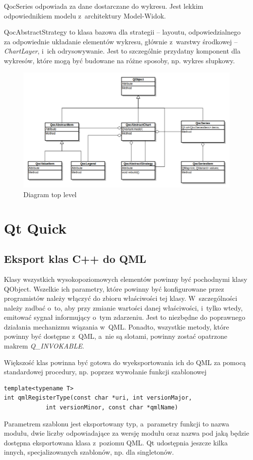 QocSeries odpowiada za dane dostarczane do wykresu. Jest lekkim odpowiednikiem modelu z~architektury Model-Widok.

QocAbstractStrategy to klasa bazowa dla strategii -- layoutu, odpowiedzialnego za odpowiednie układanie elementów wykresu, głównie z~warstwy środkowej -- \textit{ChartLayer}, i~ich odrysowywanie. Jest to szczególnie przydatny komponent dla wykresów, które mogą być budowane na różne sposoby, np. wykres słupkowy.


\begin{figure}
\centering
\caption{Diagram top level}\label{rys:klasy:top_level}
\includegraphics[scale=0.5]{img/klasy-top_level.png}
\end{figure}


\section{Qt Quick}

\subsection{Eksport klas C++ do QML}
Klasy wszystkich wysokopoziomowych elementów powinny być pochodnymi klasy QObject. Wszelkie ich parametry, które powinny być konfigurowane przez programistów należy włączyć do zbioru właściwości tej klasy. W~szczególności należy zadbać o~to, aby przy zmianie wartości danej właściwości, i~tylko wtedy, emitować sygnał informujący o~tym zdarzeniu. Jest to niezbędne do poprawnego działania mechanizmu wiązania w~QML. Ponadto, wszystkie metody, które powinny być dostępne z~QML, a~nie są slotami, powinny zostać opatrzone makrem \textit{Q\_INVOKABLE}.

Większość klas powinna być gotowa do wyeksportowania ich do QML za pomocą standardowej procedury, np. poprzez wywołanie funkcji szablonowej
\begin{lstlisting}
template<typename T>
int qmlRegisterType(const char *uri, int versionMajor, 
		    int versionMinor, const char *qmlName)
\end{lstlisting}
Parametrem szablonu jest eksportowany typ, a~parametry funkcji to nazwa modułu, dwie liczby odpowiadające za wersję modułu oraz nazwa pod jaką będzie dostępna eksportowana klasa z~poziomu QML. Qt udostępnia jeszcze kilka innych, specjalizowanych szablonów, np. dla singletonów.\newline

